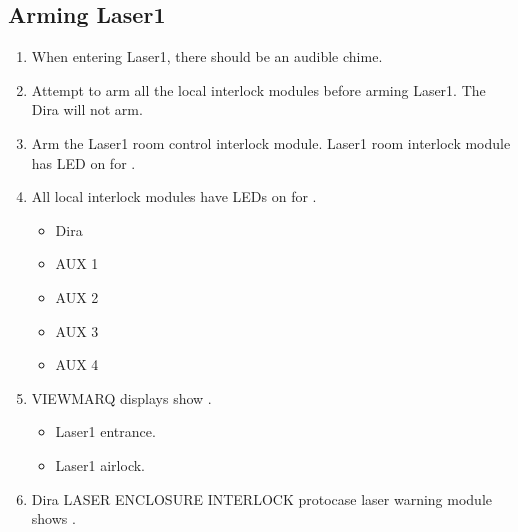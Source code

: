 \documentclass[letterpaper,10pt,english]{sphinxmanual}
\begin{document}
\subsection{Arming Laser\sphinxhyphen{}1}
\label{\detokenize{testing_documentation/Laser-1:arming-laser-1}}\begin{enumerate}
%
\item {} 
\sphinxAtStartPar
When entering Laser\sphinxhyphen{}1, there should be an audible chime.

\item {} 
\sphinxAtStartPar
Attempt to arm all the local interlock modules before arming Laser\sphinxhyphen{}1.
The Dira will not arm.

\item {} 
\sphinxAtStartPar
Arm the Laser\sphinxhyphen{}1 room control interlock module.
Laser\sphinxhyphen{}1 room interlock module has LED on for .

\item {} 
\sphinxAtStartPar
All local interlock modules have LEDs on for .
\begin{itemize}
\item {} 
\sphinxAtStartPar
Dira

\item {} 
\sphinxAtStartPar
AUX 1

\item {} 
\sphinxAtStartPar
AUX 2

\item {} 
\sphinxAtStartPar
AUX 3

\item {} 
\sphinxAtStartPar
AUX 4

\end{itemize}

\item {} 
\sphinxAtStartPar
VIEWMARQ displays show .
\begin{itemize}
\item {} 
\sphinxAtStartPar
Laser\sphinxhyphen{}1 entrance.

\item {} 
\sphinxAtStartPar
Laser\sphinxhyphen{}1 airlock.

\end{itemize}

\item {} 
\sphinxAtStartPar
Dira LASER ENCLOSURE INTERLOCK protocase laser warning module shows .


\end{enumerate}
\end{document}
